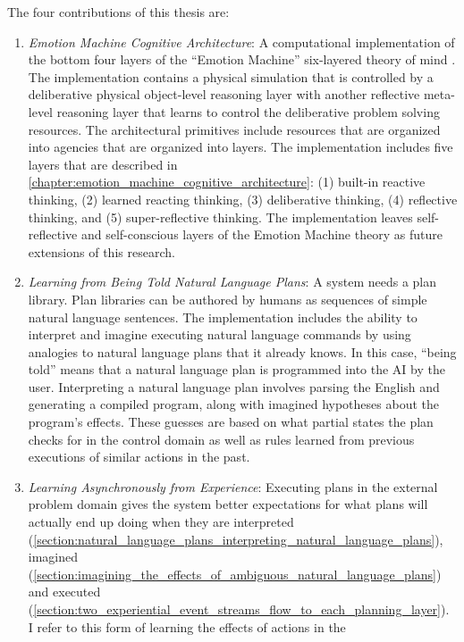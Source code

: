 The four contributions of this thesis are:
\begin{enumerate}
\item \emph{Emotion Machine Cognitive Architecture}: A computational
  implementation of the bottom four layers of the ``Emotion Machine''
  six-layered theory of mind \cite[]{minsky:2006}.  The implementation
  contains a physical simulation that is controlled by a deliberative
  physical object-level reasoning layer with another reflective
  meta-level reasoning layer that learns to control the deliberative
  problem solving resources.  The architectural primitives include
  resources that are organized into agencies that are organized into
  layers.  The implementation includes five layers that are described
  in
  {\mbox{\autoref{chapter:emotion_machine_cognitive_architecture}}}:
  (1) built-in reactive thinking, (2) learned reacting thinking, (3)
  deliberative thinking, (4) reflective thinking, and (5)
  super-reflective thinking.  The implementation leaves
  self-reflective and self-conscious layers of the Emotion Machine
  theory as future extensions of this research.
\item \emph{Learning from Being Told Natural Language Plans}: A system
  needs a plan library.  Plan libraries can be authored by humans as
  sequences of simple natural language sentences.  The implementation
  includes the ability to interpret and imagine executing natural
  language commands by using analogies to natural language plans that
  it already knows.  In this case, ``being told'' means that a natural
  language plan is programmed into the AI by the user.  Interpreting a
  natural language plan involves parsing the English and generating a
  compiled program, along with imagined hypotheses about the program's
  effects.  These guesses are based on what partial states the plan
  checks for in the control domain as well as rules learned from
  previous executions of similar actions in the past.
\item \emph{Learning Asynchronously from Experience}: Executing plans
  in the external problem domain gives the system better expectations
  for what plans will actually end up doing when they are interpreted
  ({\mbox{\autoref{section:natural_language_plans_interpreting_natural_language_plans}}}),
  imagined
  ({\mbox{\autoref{section:imagining_the_effects_of_ambiguous_natural_language_plans}}})
  and executed
  ({\mbox{\autoref{section:two_experiential_event_streams_flow_to_each_planning_layer}}}).
  I refer to this form of learning the effects of actions in the

\end{enumerate}
